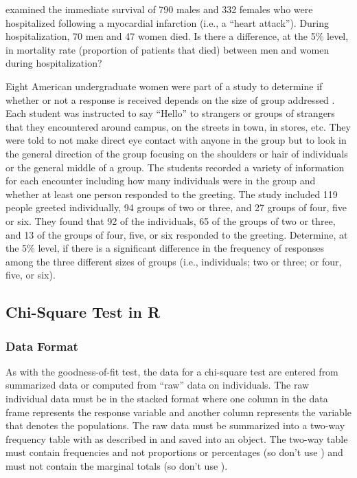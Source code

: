 \documentclass[10pt,openany]{book}\usepackage[]{graphicx}\usepackage[]{color}
\begin{document}
\begin{exsection}
  \item \label{revex:ChiMI} \cite{Fiebachetal1990} examined the immediate survival of 790 males and 332 females who were hospitalized following a myocardial infarction (i.e., a ``heart attack'').  During hospitalization, 70 men and 47 women died.  Is there a difference, at the 5\% level, in mortality rate (proportion of patients that died) between men and women during hospitalization? 

  \item \label{revex:ChiGreeting} Eight American undergraduate women were part of a study to determine if whether or not a response is received depends on the size of group addressed \citep{JonesFoshay1984}.  Each student was instructed to say ``Hello'' to strangers or groups of strangers that they encountered around campus, on the streets in town, in stores, etc.  They were told to not make direct eye contact with anyone in the group but to look in the general direction of the group focusing on the shoulders or hair of individuals or the general middle of a group.  The students recorded a variety of information for each encounter including how many individuals were in the group and whether at least one person responded to the greeting.  The study included 119 people greeted individually, 94 groups of two or three, and 27 groups of four, five or six.  They found that 92 of the individuals, 65 of the groups of two or three, and 13 of the groups of four, five, or six responded to the greeting.  Determine, at the 5\% level, if there is a significant difference in the frequency of responses among the three different sizes of groups (i.e., individuals; two or three; or four, five, or six). 
\end{exsection}


\subsection{Chi-Square Test in R}
\subsubsection{Data Format}
As with the goodness-of-fit test, the data for a chi-square test are entered from summarized data or computed from ``raw'' data on individuals.  The raw individual data must be in the stacked format where one column in the data frame represents the response variable and another column represents the variable that denotes the populations.  The raw data must be summarized into a two-way frequency table with  as described in  and saved into an object.  The two-way table must contain frequencies and not proportions or percentages (so don't use ) and must not contain the marginal totals (so don't use ).
\end{document}
